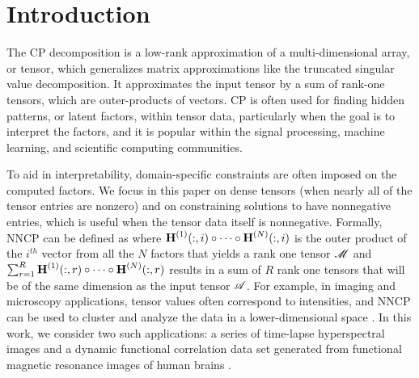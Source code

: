 
\section{Introduction}

The CP decomposition is a low-rank approximation of a multi-dimensional array, or tensor, which generalizes matrix approximations like the truncated singular value decomposition.
It approximates the input tensor by a sum of rank-one tensors, which are outer-products of vectors. 
CP is often used for finding hidden patterns, or latent factors, within tensor data, particularly when the goal is to interpret the factors, and it is popular within the signal processing, machine learning, and scientific computing communities.



To aid in interpretability, domain-specific constraints are often imposed on the computed factors.
We focus in this paper on dense tensors (when nearly all of the tensor entries are nonzero) and on constraining solutions to have nonnegative entries, which is useful when the tensor data itself is nonnegative. Formally, NNCP can be defined as
where $\Mn{H}{1}(:,i) \circ \cdots \circ \Mn{H}{N}(:,i)$ is the outer product of the $i^{th}$ vector from all the $N$ factors that yields a rank one tensor $\T{M}$ and $\sum_{r=1}^R \Mn{H}{1}(:,r) \circ \cdots \circ \Mn{H}{N}(:,r)$ results in a sum of $R$ rank one tensors that will be of the same dimension as the input tensor $\TA$. 
For example, in imaging and microscopy applications, tensor values often correspond to intensities, and NNCP can be used to cluster and analyze the data in a lower-dimensional space \cite{JC+16}.
In this work, we consider two such applications: a series of time-lapse hyperspectral images \cite{FAN16} and a dynamic functional correlation data set generated from functional magnetic resonance images of human brains \cite{VEU+12}.

